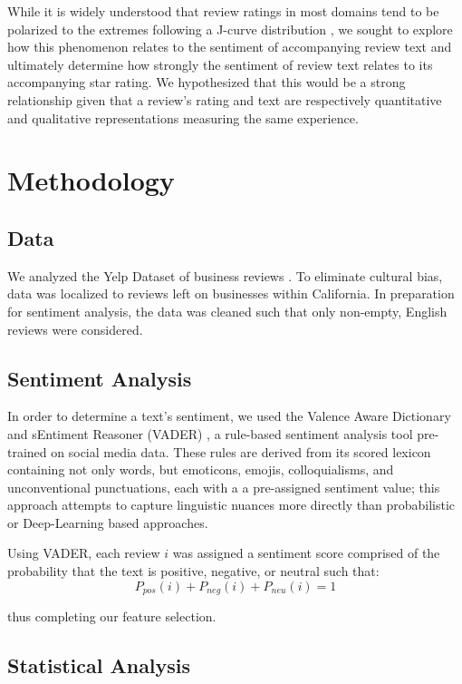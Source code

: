 \documentclass[sn-mathphys,Numbered]{sn-jnl}%
\theoremstyle{thmstyleone}%
\theoremstyle{thmstyletwo}%
\theoremstyle{thmstylethree}%
\begin{document}
While it is widely understood that review ratings in most domains tend to be polarized to the extremes following a J-curve distribution \cite{hu2006can}, we sought to explore how this phenomenon relates to the sentiment of accompanying review text and ultimately determine how strongly the sentiment of review text relates to its accompanying star rating. We hypothesized that this would be a strong relationship given that a review's rating and text are respectively quantitative and qualitative representations measuring the same experience.

\section{Methodology}\label{sec2}

\subsection{Data}
We analyzed the Yelp Dataset of business reviews \cite{yelpdataset}. To eliminate cultural bias, data was localized to reviews left on businesses within California. In preparation for sentiment analysis, the data was cleaned such that only non-empty, English reviews were considered.

\subsection{Sentiment Analysis}
In order to determine a text's sentiment, we used the  Valence Aware Dictionary and sEntiment Reasoner (VADER) \cite{hutto2014vader}, a rule-based sentiment analysis tool pre-trained on social media data. These rules are derived from its scored lexicon containing not only words, but emoticons, emojis, colloquialisms, and unconventional punctuations, each with a a pre-assigned sentiment value; this approach attempts to capture linguistic nuances more directly than probabilistic or Deep-Learning based approaches.

Using VADER, each review $i$ was assigned a sentiment score comprised of the probability that the text is positive, negative, or neutral such that:
\begin{equation}\label{prob_sum}
    P_{pos}(i) + P_{neg}(i) + P_{neu}(i) = 1
\end{equation}

thus completing our feature selection.

\subsection{Statistical Analysis}
\end{document}
